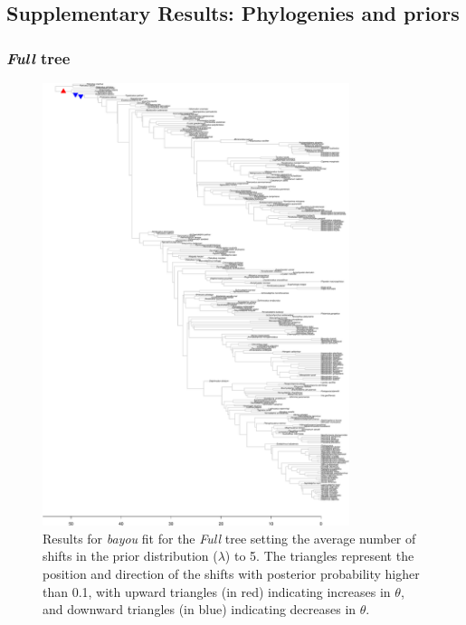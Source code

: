 \subsection{Supplementary Results: Phylogenies and priors}
\subsubsection{\textit{Full} tree}

\begin{figure}[H]
\includegraphics[width=0.8\textwidth]{img/plots-full-k5-1.pdf}
\caption{Results for \textit{bayou} fit for the \textit{Full} tree setting the average number of shifts in the prior distribution ($\lambda$) to 5. The triangles represent the position and direction of the shifts with posterior probability higher than 0.1, with upward triangles (in red) indicating increases in $\theta$, and downward triangles (in blue) indicating decreases in $\theta$.}
\label{fig:full-k5}
\end{figure}

